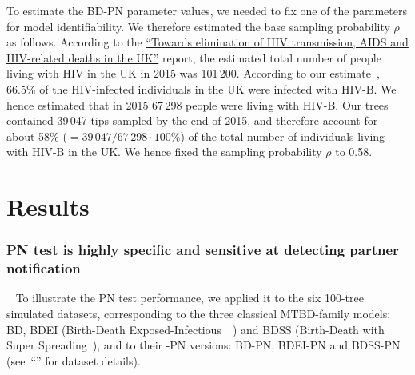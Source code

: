 \documentclass[10pt,letterpaper]{article}
\begin{document}
To estimate the BD-PN parameter values, we needed to fix one of the parameters for model identifiability. We therefore estimated the base sampling probability $\rho$ as follows. According to the \href{https://webarchive.nationalarchives.gov.uk/ukgwa/20181112132123mp_/https://assets.publishing.service.gov.uk/government/uploads/system/uploads/attachment_data/file/602942/HIV_in_the_UK_report.pdf}{``Towards elimination of HIV transmission, AIDS and HIV-related deaths in the UK''}
 report, the estimated total number of people living with HIV in the UK in 2015 was 101\,200. %
According to our estimate~\cite{zhukovaModelingDrugResistance2023}, 66.5\% of the HIV-infected individuals in the UK were infected with HIV-B. We hence estimated that in 2015 67\,298 %
people were living with HIV-B. Our trees contained 39\,047 tips sampled by the end of 2015, and therefore account for about 58\%  ($=39\,047/67\,298 \cdot 100\%$) %
of the total number of individuals living with HIV-B in the UK. We hence fixed the sampling probability $\rho$ to 0.58. %
 

\section*{Results}


\subsubsection*{PN test is highly specific and sensitive at detecting partner notification}~\label{sec:test}
To illustrate the PN test performance, we applied it to the six 100-tree simulated datasets, corresponding to the three classical MTBD-family models: BD, BDEI (Birth-Death Exposed-Infectious~~\cite{Stadler2014}) and BDSS (Birth-Death with Super Spreading~\cite{Stadler2013a}), and to their -PN versions: BD-PN, BDEI-PN and BDSS-PN (see~``'' for dataset details).
\end{document}
